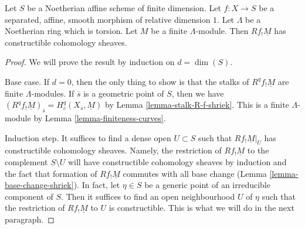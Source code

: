 \begin{lemma}
\label{lemma-constant-shriek-rel-dim-1}
Let $S$ be a Noetherian affine scheme of finite dimension.
Let $f : X \to S$ be a separated, affine, smooth morphism
of relative dimension $1$. Let $\Lambda$ be a Noetherian ring
which is torsion. Let $M$ be a finite $\Lambda$-module.
Then $Rf_!\underline{M}$ has constructible cohomology sheaves.
\end{lemma}

\begin{proof}
We will prove the result by induction on $d = \dim(S)$.

\medskip\noindent
Base case. If $d = 0$, then the only thing to show is that the stalks
of $R^qf_!\underline{M}$ are finite $\Lambda$-modules.
If $\overline{s}$ is a geometric point of $S$, then we have
$(R^qf_!\underline{M})_{\overline{s}} = H^q_c(X_{\overline{s}}, \underline{M})$
by Lemma \ref{lemma-stalk-R-f-shriek}.
This is a finite $\Lambda$-module by Lemma \ref{lemma-finiteness-curves}.

\medskip\noindent
Induction step. It suffices to find a dense open $U \subset S$ such
that $Rf_!\underline{M}|_U$ has constructible cohomology sheaves.
Namely, the restriction of $Rf_!\underline{M}$ to the complement
$S \setminus U$ will have constructible cohomology sheaves by induction
and the fact that formation of $Rf_!\underline{M}$ commutes
with all base change (Lemma \ref{lemma-base-change-shriek}).
In fact, let $\eta \in S$ be a generic point of an irreducible
component of $S$. Then it suffices to find an open neighbourhood $U$
of $\eta$ such that the restriction of $Rf_!\underline{M}$
to $U$ is constructible. This is what we will do in the next paragraph.


\end{proof}
